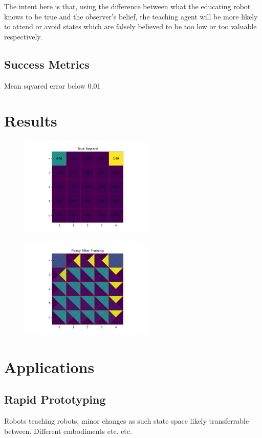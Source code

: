 \documentclass[10pt,technote]{IEEEtran}
\begin{document}
The intent here is that, using the difference between what the educating robot knows to be true and the observer's belief, the teaching agent will be more likely to attend or avoid states which are falsely believed to be too low or too valuable respectively.

\subsection{Success Metrics}

Mean sqyared error below 0.01

\section{Results} \label{sect:results}

\begin{figure}[!t]
\centering
\includegraphics[width=2.5in]{pics/True_Reward.png} 
\end{figure}

\begin{figure}[!t]
\centering
\includegraphics[width=2.5in]{pics/After_training.png} 
\end{figure}

\section{Applications} \label{sect:applications}

\subsection{Rapid Prototyping}
Robots teaching robots, minor changes as such state space likely transferrable between. Different embodiments etc. etc.
\end{document}
